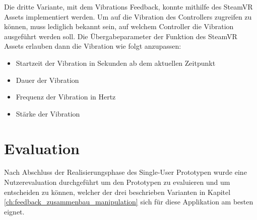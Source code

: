 Die dritte Variante, mit dem Vibrations Feedback, konnte mithilfe des SteamVR Assets implementiert werden. Um auf die Vibration des Controllers zugreifen zu können, muss lediglich bekannt sein, auf welchem Controller die Vibration ausgeführt werden soll. Die Übergabeparameter der Funktion des SteamVR Assets erlauben dann die Vibration wie folgt anzupassen:

\begin{itemize} [itemsep=1pt,topsep=0pt]
	\item Startzeit der Vibration in Sekunden ab dem aktuellen Zeitpunkt
	\item Dauer der Vibration
	\item Frequenz der Vibration in Hertz
	\item Stärke der Vibration
\end{itemize}

\pagebreak
\section{Evaluation}
Nach Abschluss der Realisierungsphase des Single-User Prototypen wurde eine Nutzerevaluation durchgeführt um den Prototypen zu evaluieren und um entscheiden zu können, welcher der drei beschrieben Varianten in Kapitel \ref{ch:feedback_zusammenbau_manipulation} sich für diese Applikation am besten eignet. 


